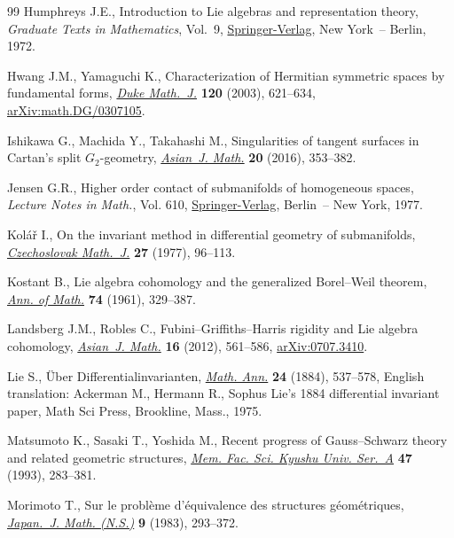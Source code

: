 \documentclass[pdftex]{sigma}%
\numberwithin{equation}{section}
\begin{document}
\begin{thebibliography}{99}
Humphreys J.E., Introduction to {L}ie algebras and representation theory,
 \textit{Graduate Texts in Mathematics}, Vol.~9, \href{https://doi.org/10.1007/978-1-4612-6398-2}{Springer-Verlag}, New York~--
 Berlin, 1972.

Hwang J.M., Yamaguchi K., Characterization of {H}ermitian symmetric spaces by
 fundamental forms, \href{https://doi.org/10.1215/S0012-7094-03-12035-9}{\textit{Duke Math.~J.}} \textbf{120} (2003), 621--634,
 \href{https://arxiv.org/abs/math.DG/0307105}{arXiv:math.DG/0307105}.

Ishikawa G., Machida Y., Takahashi M., Singularities of tangent surfaces in
 {C}artan's split {$G_2$}-geometry, \href{https://doi.org/10.4310/AJM.2016.v20.n2.a6}{\textit{Asian~J. Math.}} \textbf{20}
 (2016), 353--382.

Jensen G.R., Higher order contact of submanifolds of homogeneous spaces,
 \textit{Lecture Notes in Math.}, Vol. 610, \href{https://doi.org/10.1007/BFb0068415}{Springer-Verlag}, Berlin~-- New
 York, 1977.

Kol\'a\v{r} I., On the invariant method in differential geometry of
 submanifolds, \href{https://doi.org/10.21136/CMJ.1977.101448}{\textit{Czechoslovak Math.~J.}} \textbf{27} (1977), 96--113.

Kostant B., Lie algebra cohomology and the generalized {B}orel--{W}eil theorem,
 \href{https://doi.org/10.2307/1970237}{\textit{Ann. of Math.}} \textbf{74} (1961), 329--387.

Landsberg J.M., Robles C., Fubini--{G}riffiths--{H}arris rigidity and {L}ie
 algebra cohomology, \href{https://doi.org/10.4310/AJM.2012.v16.n4.a1}{\textit{Asian~J. Math.}} \textbf{16} (2012), 561--586,
 \href{https://arxiv.org/abs/0707.3410}{arXiv:0707.3410}.

Lie S., \"Uber Differentialinvarianten, \href{https://doi.org/10.1007/BF01447449}{\textit{Math. Ann.}} \textbf{24} (1884),
 537--578, {E}nglish translation: Ackerman M., Hermann R., Sophus Lie's 1884
 differential invariant paper, Math Sci Press, Brookline, Mass., 1975.

Matsumoto K., Sasaki T., Yoshida M., Recent progress of {G}auss--{S}chwarz
 theory and related geometric structures, \href{https://doi.org/10.2206/kyushumfs.47.283}{\textit{Mem. Fac. Sci. Kyushu Univ.
 Ser.~A}} \textbf{47} (1993), 283--381.

Morimoto T., Sur le probl\`eme d'\'equivalence des structures g\'eom\'etriques,
 \href{https://doi.org/10.4099/math1924.9.293}{\textit{Japan.~J. Math. (N.S.)}} \textbf{9} (1983), 293--372.


\end{thebibliography}
\end{document}

